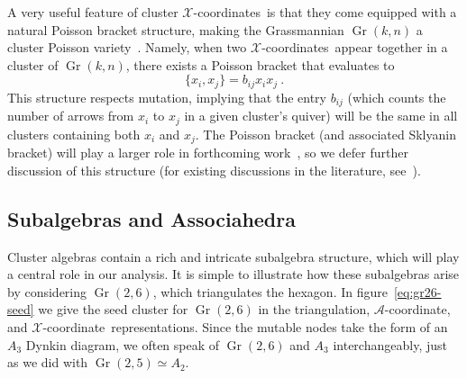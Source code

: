 \documentclass[12pt]{article}
\DeclareMathOperator{\Gr}{Gr}
\def\xcoord{$\mathcal{X}$-coordinate}
\def\xcoords{$\mathcal{X}$-coordinates}
\def\acoord{$\mathcal{A}$-coordinate}
\begin{document}
A very useful feature of cluster \xcoords\ is that they come equipped with a natural Poisson bracket structure, making the Grassmannian $\Gr(k,n)$ a cluster Poisson variety~\cite{GSV}. Namely, when two \xcoords\ appear together in a cluster of $\Gr(k,n)$, there exists a Poisson bracket that evaluates to
\begin{equation}
\{x_i, x_j \} = b_{ij} x_i x_j \ .
\end{equation}
This structure respects mutation, implying that the entry $b_{ij}$ (which counts the number of arrows from $x_i$ to $x_j$ in a given cluster's quiver) will be the same in all clusters containing both $x_i$ and $x_j$. The Poisson bracket (and associated Sklyanin bracket) will play a larger role in forthcoming work~\cite{cluster_subalgebras_ii}, so we defer further discussion of this structure (for existing discussions in the literature, see~\cite{PoissonVarieties,Vergu:2015svm}).

\subsection{Subalgebras and Associahedra}\label{sec:subalgebras_associahedra}

Cluster algebras contain a rich and intricate subalgebra structure, which will play a central role in our analysis. It is simple to illustrate how these subalgebras arise by considering $\Gr(2,6)$, which triangulates the hexagon. In figure~\ref{eq:gr26-seed} we give the seed cluster for $\Gr(2,6)$ in the triangulation, \acoord, and \xcoord\ representations. Since the mutable nodes take the form of an $A_3$ Dynkin diagram, we often speak of $\Gr(2,6)$ and $A_3$ interchangeably, just as we did with $\Gr(2,5) \simeq A_2$. 
\end{document}
